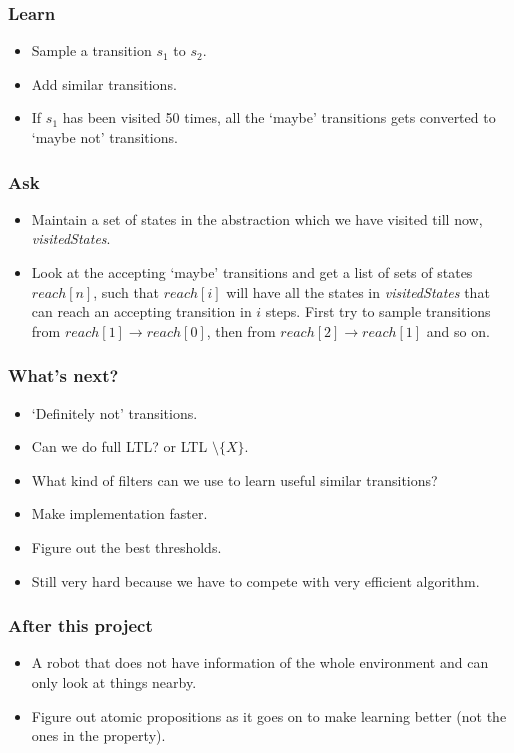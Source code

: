 \documentclass{beamer}
\begin{document}
	\begin{frame}
		\frametitle{Learn}
		\begin{itemize}
			\item Sample a transition $s_1$ to $s_2$. 	\pause
			\item Add similar transitions.	\pause
			\item If $s_1$ has been visited 50 times, all the `maybe' transitions gets converted to `maybe not' transitions.
		\end{itemize}
	\end{frame}

	\begin{frame}
		\frametitle{Ask}
			\begin{itemize}
				\item Maintain a set of states in the abstraction which we have visited till now, \emph{visitedStates}. \pause
				\item Look at the accepting `maybe' transitions and get a list of sets of states $reach[n]$, such that $reach[i]$ will have all the states in \emph{visitedStates} that can reach an accepting transition in $i$ steps. First try to sample transitions from $reach[1] \rightarrow reach[0]$, then from $reach[2] \rightarrow reach[1]$ and so on.
			\end{itemize}
			
	\end{frame}

	\begin{frame}
		\frametitle{What's next?}
		\begin{itemize}
			\item `Definitely not' transitions. \pause
			\item Can we do full LTL? or LTL $\setminus \{X\}$. \pause
			\item What kind of filters can we use to learn useful similar transitions? \pause
			\item Make implementation faster. \pause
			\item Figure out the best thresholds. 	\pause
			\item Still very hard because we have to compete with very efficient algorithm.
		\end{itemize}
		
	\end{frame}


	\begin{frame}
		\frametitle{After this project}
		\begin{itemize}
			\item A robot that does not have information of the whole environment and can only look at things nearby. \pause
			\item Figure out atomic propositions as it goes on to make learning better (not the ones in the property).
		\end{itemize}
	\end{frame}
	
	
\end{document}
